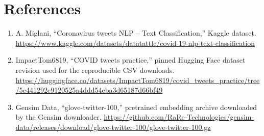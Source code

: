 \newpage
\section*{References}

\begin{enumerate}
  \item A. Miglani, ``Coronavirus tweets NLP -- Text Classification,'' Kaggle dataset. \url{https://www.kaggle.com/datasets/datatattle/covid-19-nlp-text-classification}
  \item ImpactTom6819, ``COVID tweets practice,'' pinned Hugging Face dataset revision used for the reproducible CSV downloads. \url{https://huggingface.co/datasets/ImpactTom6819/covid_tweets_practice/tree/5e441292c9120525a4ddd54eba3d65187d66bf49}
  \item Gensim Data, ``glove-twitter-100,'' pretrained embedding archive downloaded by the Gensim downloader. \url{https://github.com/RaRe-Technologies/gensim-data/releases/download/glove-twitter-100/glove-twitter-100.gz}
\end{enumerate}
